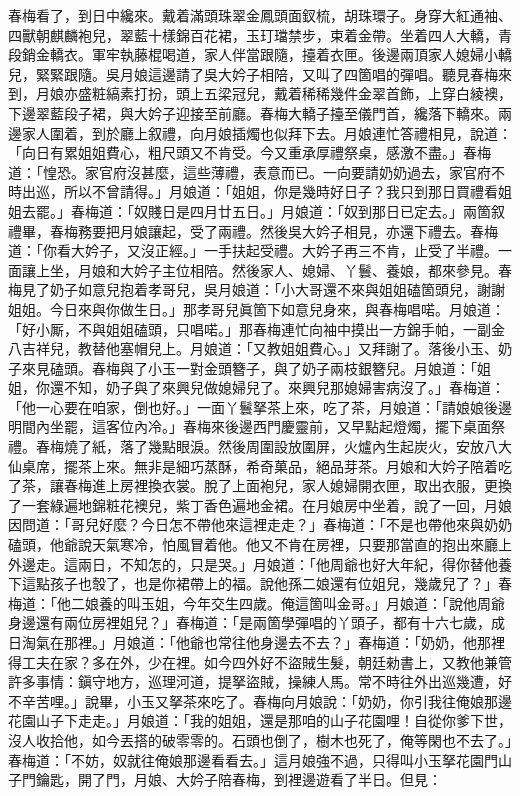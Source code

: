 春梅看了，到日中纔來。戴着滿頭珠翠金鳳頭面釵梳，胡珠環子。身穿大紅通袖、四獸朝麒麟袍兒，翠藍十樣錦百花裙，玉玎璫禁步，束着金帶。坐着四人大轎，青段銷金轎衣。軍牢執藤棍喝道，家人伴當跟隨，擡着衣匣。後邊兩頂家人媳婦小轎兒，緊緊跟隨。{}吳月娘這邊請了吳大妗子相陪，又叫了四箇唱的彈唱。聽見春梅來到，月娘亦盛粧縞素打扮，頭上五梁冠兒，戴着稀稀幾件金翠首飾，{}上穿白綾襖，下邊翠藍段子裙，與大妗子迎接至前廳。春梅大轎子擡至儀門首，纔落下轎來。兩邊家人圍着，到於廳上叙禮，向月娘插燭也似拜下去。月娘連忙答禮相見，說道：「向日有累姐姐費心，粗尺頭又不肯受。今又重承厚禮祭桌，感激不盡。」春梅道：「惶恐。家官府沒甚麼，這些薄禮，表意而已。一向要請奶奶過去，家官府不時出巡，所以不曾請得。」月娘道：「姐姐，你是幾時好日子？我只到那日買禮看姐姐去罷。」{}春梅道：「奴賤日是四月廿五日。」月娘道：「奴到那日已定去。」兩箇叙禮畢，春梅務要把月娘讓起，受了兩禮。然後吳大妗子相見，亦還下禮去。春梅道：「你看大妗子，又沒正經。」一手扶起受禮。大妗子再三不肯，止受了半禮。一面讓上坐，月娘和大妗子主位相陪。然後家人、媳婦、丫鬟、養娘，都來參見。春梅見了奶子如意兒抱着孝哥兒，吳月娘道：「小大哥還不來與姐姐磕箇頭兒，謝謝姐姐。今日來與你做生日。」那孝哥兒眞箇下如意兒身來，與春梅唱喏。月娘道：「好小厮，不與姐姐磕頭，只唱喏。」那春梅連忙向袖中摸出一方錦手帕，一副金八吉祥兒，教替他塞帽兒上。月娘道：「又教姐姐費心。」又拜謝了。落後小玉、奶子來見磕頭。春梅與了小玉一對金頭簪子，{}與了奶子兩枝銀簪兒。月娘道：「姐姐，你還不知，奶子與了來興兒做媳婦兒了。來興兒那媳婦害病沒了。」春梅道：「他一心要在咱家，倒也好。」{}一面丫鬟拏茶上來，吃了茶，月娘道：「請娘娘後邊明間內坐罷，這客位內冷。」春梅來後邊西門慶靈前，又早點起燈燭，擺下桌面祭禮。春梅燒了紙，落了幾點眼淚。{}然後周圍設放圍屏，火爐內生起炭火，安放八大仙桌席，擺茶上來。無非是細巧蒸酥，希奇菓品，絕品芽茶。月娘和大妗子陪着吃了茶，讓春梅進上房裡換衣裳。脫了上面袍兒，家人媳婦開衣匣，取出衣服，更換了一套綠遍地錦粧花襖兒，紫丁香色遍地金裙。在月娘房中坐着，說了一回，月娘因問道：「哥兒好麼？今日怎不帶他來這裡走走？」春梅道：「不是也帶他來與奶奶磕頭，他爺說天氣寒冷，怕風冒着他。他又不肯在房裡，只要那當直的抱出來廳上外邊走。{}這兩日，不知怎的，只是哭。」月娘道：「他周爺也好大年紀，得你替他養下這點孩子也彀了，也是你裙帶上的福。說他孫二娘還有位姐兒，幾歲兒了？」春梅道：「他二娘養的叫玉姐，今年交生四歲。俺這箇叫金哥。」月娘道：「說他周爺身邊還有兩位房裡姐兒？」春梅道：「是兩箇學彈唱的丫頭子，都有十六七歲，成日淘氣在那裡。」月娘道：「他爺也常往他身邊去不去？」{}春梅道：「奶奶，他那裡得工夫在家？多在外，少在裡。如今四外好不盜賊生髮，朝廷勑書上，又教他兼管許多事情：鎭守地方，巡理河道，提拏盜賊，操練人馬。常不時往外出巡幾遭，好不辛苦哩。」說畢，小玉又拏茶來吃了。春梅向月娘說：「奶奶，你引我往俺娘那邊花園山子下走走。」月娘道：「我的姐姐，還是那咱的山子花園哩！自從你爹下世，沒人收拾他，如今丟搭的破零零的。石頭也倒了，樹木也死了，俺等閑也不去了。」春梅道：「不妨，奴就往俺娘那邊看看去。」這月娘強不過，只得叫小玉拏花園門山子門鑰匙，開了門，月娘、大妗子陪春梅，到裡邊遊看了半日。但見：

